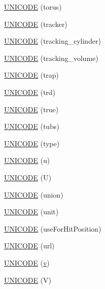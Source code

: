 \begin{DoxyCompactItemize}
\hyperlink{namespace_d_d4hep_1_1_x_m_l_ade929897d75b8e68deb204d4169fd7d1}{U\+N\+I\+C\+O\+DE} (torus)
\item 
\hyperlink{namespace_d_d4hep_1_1_x_m_l_a34e397188bc5912d25b3e61a232bed57}{U\+N\+I\+C\+O\+DE} (tracker)
\item 
\hyperlink{namespace_d_d4hep_1_1_x_m_l_a89f1fb0984e2823132240fb9d3520b21}{U\+N\+I\+C\+O\+DE} (tracking\+\_\+cylinder)
\item 
\hyperlink{namespace_d_d4hep_1_1_x_m_l_ab293b8cea7878daa0cdfaefe143e05e5}{U\+N\+I\+C\+O\+DE} (tracking\+\_\+volume)
\item 
\hyperlink{namespace_d_d4hep_1_1_x_m_l_a8ec122b4dce94b84b3dc3a8ebfb5a1c5}{U\+N\+I\+C\+O\+DE} (trap)
\item 
\hyperlink{namespace_d_d4hep_1_1_x_m_l_ad6ad99ba2edf397c3a1758c2deec0228}{U\+N\+I\+C\+O\+DE} (trd)
\item 
\hyperlink{namespace_d_d4hep_1_1_x_m_l_acb8870e3f346c1088e7754e7e35222e6}{U\+N\+I\+C\+O\+DE} (true)
\item 
\hyperlink{namespace_d_d4hep_1_1_x_m_l_a2135901b4c1064197d7531e166c6c7a1}{U\+N\+I\+C\+O\+DE} (tubs)
\item 
\hyperlink{namespace_d_d4hep_1_1_x_m_l_a4cf4043ff061cf55d8dce92f36341a45}{U\+N\+I\+C\+O\+DE} (type)
\item 
\hyperlink{namespace_d_d4hep_1_1_x_m_l_a59abd1d37fc0ca492051b81ed56cb366}{U\+N\+I\+C\+O\+DE} (u)
\item 
\hyperlink{namespace_d_d4hep_1_1_x_m_l_a20bac6ae34f50451f6fa8d3a370ea837}{U\+N\+I\+C\+O\+DE} (U)
\item 
\hyperlink{namespace_d_d4hep_1_1_x_m_l_a7abb10710f27bbb30f24efe95e9645df}{U\+N\+I\+C\+O\+DE} (union)
\item 
\hyperlink{namespace_d_d4hep_1_1_x_m_l_ab95fce74e56fc43c2f945d306e4324c4}{U\+N\+I\+C\+O\+DE} (unit)
\item 
\hyperlink{namespace_d_d4hep_1_1_x_m_l_a5d336c5ce0a490917ab11d6a0442c8fb}{U\+N\+I\+C\+O\+DE} (use\+For\+Hit\+Position)
\item 
\hyperlink{namespace_d_d4hep_1_1_x_m_l_a29add9e807257ad9eb0af9ebcd8cf77e}{U\+N\+I\+C\+O\+DE} (url)
\item 
\hyperlink{namespace_d_d4hep_1_1_x_m_l_a7071c039a395501190f53ad700ee9772}{U\+N\+I\+C\+O\+DE} (\hyperlink{_multi_view_8cpp_a8320ee13ac034dbf6d624fe8953dd337}{v})
\item 
\hyperlink{namespace_d_d4hep_1_1_x_m_l_a28c05b5730b6137ed7297220a32bf7e7}{U\+N\+I\+C\+O\+DE} (V)
\item 

\end{DoxyCompactItemize}

